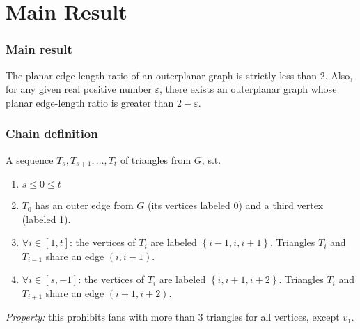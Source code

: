 \documentclass[xetex,mathserif,serif]{beamer}
\begin{document}
\section{Main Result}

\begin{frame}
  \frametitle{Main result}
  \begin{theorem}
    The planar edge-length ratio of an outerplanar graph is strictly less than 2. Also, for any given real positive number \(\varepsilon\), there exists an outerplanar graph whose planar edge-length ratio is greater than \(2 - \varepsilon\).
    \end{theorem}
\end{frame}

\begin{frame}
  \frametitle{Chain definition}
  A sequence \(T_s, T_{s+1}, \dots, T_t\) of triangles from \(G\), s.t.
  \begin{enumerate}
  \item \(s \leq 0 \leq t\)
  \item \(T_0\) has an outer edge from \(G\) (its vertices labeled 0) and a third vertex (labeled 1).
  \item \(\forall i\in [1, t]\): the vertices of \(T_i\) are labeled \(\left\{i - 1, i, i + 1\right\}\). Triangles \(T_i\) and \(T_{i - 1}\) share an edge \((i, i - 1)\).
  \item \(\forall i\in [s, -1]\): the vertices of \(T_i\) are labeled \(\left\{i, i + 1, i + 2\right\}\). Triangles \(T_i\) and \(T_{i + 1}\) share an edge \((i + 1, i + 2)\).
  \end{enumerate}

  \pause
  \emph{Property:} this prohibits fans with more than 3 triangles for all vertices, except \(v_1\).
\end{frame}
\end{document}

